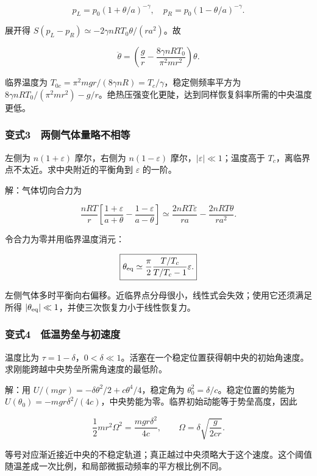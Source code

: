 \documentclass[12pt,a4paper,fontset=fandol]{ctexart}
\begin{document}
\[p_L=p_0(1+\theta/a)^{-\gamma},\quad
p_R=p_0(1-\theta/a)^{-\gamma}.\]

展开得 \(S(p_L-p_R)\simeq-2\gamma nRT_0\theta/(ra^2)\)。故

\[\ddot\theta=\left(\frac gr-\frac{8\gamma nRT_0}{\pi^2mr^2}\right)\theta.\]

临界温度为 \(T_{0c}=\pi^2mgr/(8\gamma nR)=T_c/\gamma\)，稳定侧频率平方为
\(8\gamma nRT_0/(\pi^2mr^2)-g/r\)。绝热压强变化更陡，达到同样恢复斜率所需的中央温度更低。

\subsubsection{变式3　两侧气体量略不相等}\label{ux53d8ux5f0f3-ux4e24ux4fa7ux6c14ux4f53ux91cfux7565ux4e0dux76f8ux7b49}

左侧为 \(n(1+\varepsilon)\) 摩尔，右侧为 \(n(1-\varepsilon)\)
摩尔，\(|\varepsilon|\ll1\)；温度高于
\(T_c\)，离临界点不太近。求中央附近的平衡角到 \(\varepsilon\) 的一阶。

解：气体切向合力为

\[\frac{nRT}{r}\left[\frac{1+\varepsilon}{a+\theta}
-\frac{1-\varepsilon}{a-\theta}\right]
\simeq\frac{2nRT\varepsilon}{ra}-\frac{2nRT\theta}{ra^2}.\]

令合力为零并用临界温度消元：

\[\boxed{\theta_{\rm eq}\simeq
\frac{\pi}{2}\frac{T/T_c}{T/T_c-1}\varepsilon.}\]

左侧气体多时平衡向右偏移。近临界点分母很小，线性式会失效；使用它还须满足所得
\(|\theta_{\rm eq}|\ll1\)，并使三次恢复力小于线性恢复力。

\subsubsection{变式4　低温势垒与初速度}\label{ux53d8ux5f0f4-ux4f4eux6e29ux52bfux5792ux4e0eux521dux901fux5ea6}

温度比为
\(\tau=1-\delta\)，\(0<\delta\ll1\)。活塞在一个稳定位置获得朝中央的初始角速度。求刚能跨越中央势垒所需角速度的最低阶。

解：用 \(U/(mgr)=-\delta\theta^2/2+c\theta^4/4\)，稳定角为
\(\theta_0^2=\delta/c\)。稳定位置的势能为
\(U(\theta_0)=-mgr\delta^2/(4c)\)，中央势能为零。临界初始动能等于势垒高度，因此

\[\frac12mr^2\Omega^2=\frac{mgr\delta^2}{4c},\qquad
\boxed{\Omega=\delta\sqrt{\frac{g}{2cr}}.}\]

等号对应渐近接近中央的不稳定轨道；真正越过中央须略大于这个速度。这个阈值随温差成一次比例，和局部微振动频率的平方根比例不同。
\end{document}
